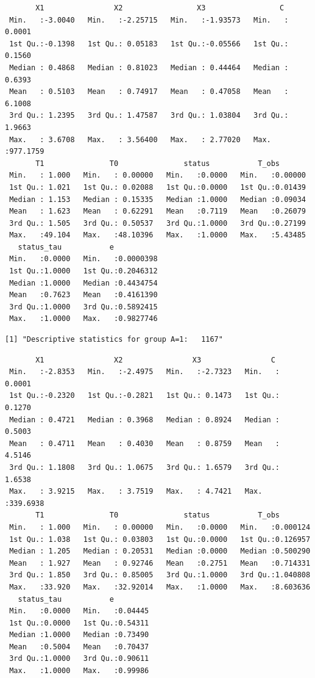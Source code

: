 \documentclass[
  11pt,
  a4paper,
]{article}
\theoremstyle{plain}
\theoremstyle{plain}
\theoremstyle{plain}
\theoremstyle{definition}
\theoremstyle{remark}
\begin{document}
\begin{verbatim}
       X1                X2                 X3                 C           
 Min.   :-3.0040   Min.   :-2.25715   Min.   :-1.93573   Min.   :  0.0001  
 1st Qu.:-0.1398   1st Qu.: 0.05183   1st Qu.:-0.05566   1st Qu.:  0.1560  
 Median : 0.4868   Median : 0.81023   Median : 0.44464   Median :  0.6393  
 Mean   : 0.5103   Mean   : 0.74917   Mean   : 0.47058   Mean   :  6.1008  
 3rd Qu.: 1.2395   3rd Qu.: 1.47587   3rd Qu.: 1.03804   3rd Qu.:  1.9663  
 Max.   : 3.6708   Max.   : 3.56400   Max.   : 2.77020   Max.   :977.1759  
       T1               T0               status           T_obs        
 Min.   : 1.000   Min.   : 0.00000   Min.   :0.0000   Min.   :0.00000  
 1st Qu.: 1.021   1st Qu.: 0.02088   1st Qu.:0.0000   1st Qu.:0.01439  
 Median : 1.153   Median : 0.15335   Median :1.0000   Median :0.09034  
 Mean   : 1.623   Mean   : 0.62291   Mean   :0.7119   Mean   :0.26079  
 3rd Qu.: 1.505   3rd Qu.: 0.50537   3rd Qu.:1.0000   3rd Qu.:0.27199  
 Max.   :49.104   Max.   :48.10396   Max.   :1.0000   Max.   :5.43485  
   status_tau           e            
 Min.   :0.0000   Min.   :0.0000398  
 1st Qu.:1.0000   1st Qu.:0.2046312  
 Median :1.0000   Median :0.4434754  
 Mean   :0.7623   Mean   :0.4161390  
 3rd Qu.:1.0000   3rd Qu.:0.5892415  
 Max.   :1.0000   Max.   :0.9827746  
\end{verbatim}

\begin{verbatim}
[1] "Descriptive statistics for group A=1:   1167"
\end{verbatim}

\begin{verbatim}
       X1                X2                X3                C           
 Min.   :-2.8353   Min.   :-2.4975   Min.   :-2.7323   Min.   :  0.0001  
 1st Qu.:-0.2320   1st Qu.:-0.2821   1st Qu.: 0.1473   1st Qu.:  0.1270  
 Median : 0.4721   Median : 0.3968   Median : 0.8924   Median :  0.5003  
 Mean   : 0.4711   Mean   : 0.4030   Mean   : 0.8759   Mean   :  4.5146  
 3rd Qu.: 1.1808   3rd Qu.: 1.0675   3rd Qu.: 1.6579   3rd Qu.:  1.6538  
 Max.   : 3.9215   Max.   : 3.7519   Max.   : 4.7421   Max.   :339.6938  
       T1               T0               status           T_obs         
 Min.   : 1.000   Min.   : 0.00000   Min.   :0.0000   Min.   :0.000124  
 1st Qu.: 1.038   1st Qu.: 0.03803   1st Qu.:0.0000   1st Qu.:0.126957  
 Median : 1.205   Median : 0.20531   Median :0.0000   Median :0.500290  
 Mean   : 1.927   Mean   : 0.92746   Mean   :0.2751   Mean   :0.714331  
 3rd Qu.: 1.850   3rd Qu.: 0.85005   3rd Qu.:1.0000   3rd Qu.:1.040808  
 Max.   :33.920   Max.   :32.92014   Max.   :1.0000   Max.   :8.603636  
   status_tau           e          
 Min.   :0.0000   Min.   :0.04445  
 1st Qu.:0.0000   1st Qu.:0.54311  
 Median :1.0000   Median :0.73490  
 Mean   :0.5004   Mean   :0.70437  
 3rd Qu.:1.0000   3rd Qu.:0.90611  
 Max.   :1.0000   Max.   :0.99986  
\end{verbatim}
\end{document}
